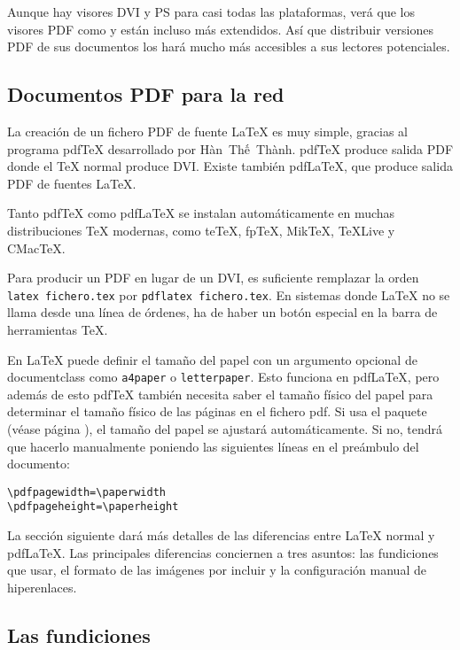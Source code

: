 Aunque hay visores DVI y PS para casi todas las plataformas, verá que
los visores PDF como 
 y  están incluso más extendidos.  Así que
distribuir versiones PDF de sus documentos los hará mucho más
accesibles a sus lectores potenciales.

\subsection{Documentos PDF para la red}

La creación de un fichero PDF de fuente \LaTeX{} es muy simple,
gracias al programa pdf\TeX{} desarrollado por
H\`an~Th\'{\^e}~Th\`anh. pdf\TeX{} produce salida PDF donde el
\TeX{} normal produce DVI.  Existe también pdf\LaTeX{}, que produce
 salida PDF de fuentes \LaTeX{}. 

Tanto pdf\TeX{} como pdf\LaTeX{} se instalan automáticamente en muchas
distribuciones \TeX{} modernas, como te\TeX{}, fp\TeX{},
Mik\TeX, \TeX{}Live y CMac\TeX{}.

Para producir un PDF en lugar de un DVI, es suficiente remplazar la
orden \texttt{latex fichero.tex} por \texttt{pdflatex fichero.tex}.
En sistemas donde \LaTeX{} no se llama desde una línea de órdenes, ha
de haber un botón especial en la barra de herramientas \TeX{}.

En \LaTeX{} puede definir el tamaño del papel con un argumento
opcional de documentclass como \texttt{a4paper} o
\texttt{letterpaper}.  Esto funciona en pdf\LaTeX{}, pero además
de esto pdf\TeX{} también necesita saber el tamaño físico del papel
para determinar el tamaño físico de las páginas en el fichero pdf.
 Si usa el paquete  (véase página
\pageref{ssec:pdfhyperref}), el tamaño del papel se ajustará
automáticamente.  Si no, tendrá que hacerlo manualmente poniendo las
siguientes líneas en el preámbulo del documento:
\begin{code}
\begin{verbatim}
\pdfpagewidth=\paperwidth
\pdfpageheight=\paperheight
\end{verbatim}
\end{code}

La sección siguiente dará más detalles de las diferencias entre
\LaTeX{} normal y pdf\LaTeX{}.  Las principales diferencias conciernen
a tres asuntos: las fundiciones que usar, el formato de las imágenes
por incluir y la configuración manual de hiperenlaces.

\subsection{Las fundiciones}

